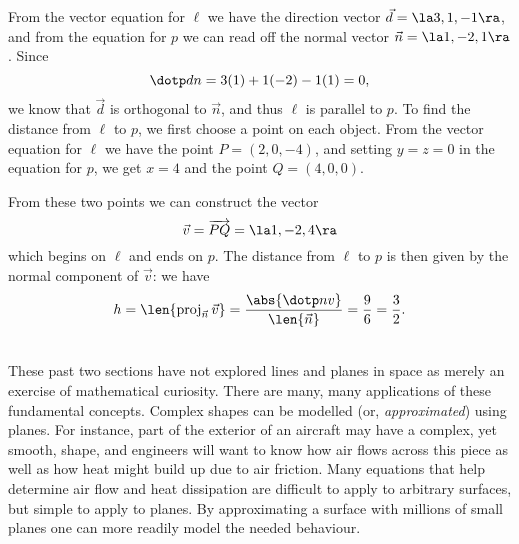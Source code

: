 {From the vector equation for $\ell$ we have the direction vector $\vec{d} = \la 3, 1, -1\ra$, and from the equation for $p$ we can read off the normal vector $\vec{n} = \la 1, -2, 1\ra$. Since
\[
\dotp dn = 3(1)+1(-2)-1(1) = 0,
\]
we know that $\vec{d}$ is orthogonal to $\vec{n}$, and thus $\ell$ is parallel to $p$. To find the distance from $\ell$ to $p$, we first choose a point on each object. From the vector equation for $\ell$ we have the point $P=(2,0,-4)$, and setting $y=z=0$ in the equation for $p$, we get $x=4$ and the point $Q=(4,0,0)$.

From these two points we can construct the vector 
\[
\vec v = \overrightarrow{PQ} = \la 1, -2, 4\ra
\]
which begins on $\ell$ and ends on $p$. The distance from $\ell$ to $p$ is then given by the normal component of $\vec{v}$: we have
\[
h = \len{\operatorname{proj}_{\vec{n}}\vec{v}} = \frac{\abs{\dotp nv}}{\len{\vec{n}}} = \frac{9}{6} = \frac{3}{2}.
\]}\\

These past two sections have not explored lines and planes in space as merely an exercise of mathematical curiosity. There are many, many applications of these fundamental concepts. Complex shapes can be modelled (or, \textit{approximated}) using planes. For instance, part of the exterior of an aircraft may have a complex, yet smooth, shape, and engineers will want to know how air flows across this piece as well as how heat might build up due to air friction. Many equations that help determine air flow and heat dissipation are difficult to apply to arbitrary surfaces, but simple to apply to planes. By approximating a surface with millions of small planes one can more readily model the needed behaviour.

